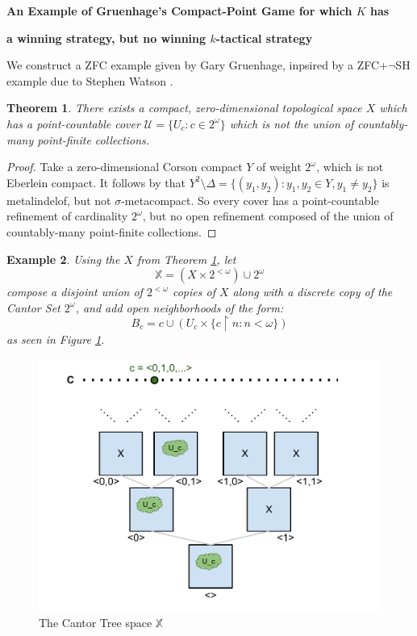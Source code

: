 \documentclass[11pt]{article}
\theoremstyle{plain}
\newtheorem{theorem}{Theorem}
\newtheorem{example}[theorem]{Example}
\theoremstyle{definition}
\theoremstyle{remark}
\newcommand{\<}{\langle}
\renewcommand{\>}{\rangle}
\newcommand{\rest}{\restriction}
\begin{document}
\centerline{\bf An Example of Gruenhage's Compact-Point Game for which $K$ has }
\centerline{\bf a winning strategy, but no winning $k$-tactical strategy}

We construct a ZFC example given by Gary Gruenhage, inpsired by a ZFC+$\lnot$SH example due to Stephen Watson \cite{Watson}.

\begin{theorem}\label{basic_x}
There exists a compact, zero-dimensional topological space $X$ which has a point-countable cover $\mathcal{U} = \{U_c : c \in 2^\omega\}$ which is not the union of countably-many point-finite collections.
\end{theorem}

\begin{proof}
Take a zero-dimensional Corson compact $Y$ of weight $2^\omega$, which is not Eberlein compact. It follows by \cite{G1} that $Y^2 \setminus \Delta = \{(y_1,y_2): y_1,y_2 \in Y, y_1\not=y_2\}$ is metalindelof, but not $\sigma$-metacompact. So every cover has a point-countable refinement of cardinality $2^\omega$, but no open refinement composed of the union of countably-many point-finite collections.
\end{proof}

\begin{example}
Using the $X$ from Theorem \ref{basic_x}, let \[\mathbb{X} = (X \times 2^{<\omega}) \cup 2^\omega\] compose a disjoint union of $2^{<\omega}$ copies of $X$ along with a discrete copy of the Cantor Set $2^\omega$, and add open neighborhoods of the form: 
  \[
    B_c = c \cup (U_c \times \{c\rest n : n < \omega\})
  \]
as seen in Figure \ref{fig:cantor_tree}.
\end{example}

\begin{figure}[p]
  \centering
  \includegraphics[width=6in]{cantor_tree_open.pdf}
  \caption{The Cantor Tree space $\mathbb{X}$}
  \label{fig:cantor_tree}
\end{figure}
\end{document}

